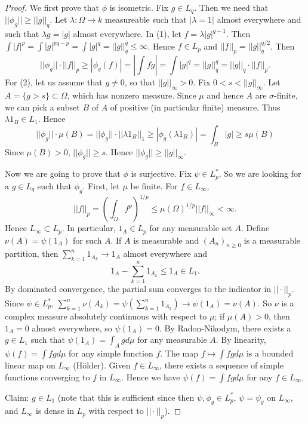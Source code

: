 \begin{proof}
  We first prove that $\phi$ is isometric.
  Fix $g\in L_q$.
  Then we need that $||\phi_g||\geq ||g||_q$.
  Let $\lambda:\Omega\to k$ measureable such that $|\lambda =1|$ almost everywhere
  and such that $\lambda g=|g|$ almost everywhere.
  In (1), let $f=\lambda |g|^{q-1}$.
  Then $\int |f|^p=\int |g|^{pq-p}=\int |g|^q=||g||_q^q\leq \infty$.
  Hence $f\in L_p$ and $||f||_p=||g||_q^{q/2}$.
  Then $$||\phi_g||\cdot ||f||_p\geq |\phi_g(f)|=|\int f g | = \int |g|^q=||g||_q^q=||g||_q\cdot ||f||_p.$$
  For (2), let us assume that $g\neq 0$, so that $||g||_\infty>0$.
  Fix $0<s<||g||_\infty$.
  Let $A=\{g>s\}\subset \Omega$, which has nonzero measure.
  Since $\mu$ and hence $A$ are $\sigma$-finite,
  we can pick a subset $B$ of $A$ of positive (in particular finite) measure.
  Thus $\lambda 1_B\in L_1$.
  Hence
  $$||\phi_g||\cdot \mu(B)=||\phi_g||\cdot ||\lambda 1_B||_1\geq |\phi_g (\lambda 1_B)|=\int_B |g|\geq s\mu (B)$$
  Since $\mu(B)>0$, $||\phi_g||\geq s$.
  Hence $||\phi_g||\geq ||g||_\infty$.

  Now we are going to prove that $\phi$ is surjective.
  Fix $\psi\in L_p^*$.
  So we are looking for a $g\in L_q$ such that $\phi_g$.
  First, let $\mu$ be finite. For $f\in L_\infty$,
  $$||f||_p=\left(\int_\Omega f^p\right)^{1/p}\leq \mu(\Omega)^{1/p}||f||_\infty<\infty.$$
  Hence $L_\infty \subset L_p$. In particular, $1_A\in L_p$ for any measurable set $A$.
  Define $\nu(A)=\psi(1_A)$ for such $A$.
  If $A$ is measurable and $(A_n)_{n\geq 0}$ is a measurable partition,
  then $\sum_{k=1}^n 1_{A_k}\to 1_A$ almost everywhere
  and
  $$1_A-\sum_{k=1}^n 1_{A_k}\leq 1_A\in L_1.$$
  By dominated convergence, the partial sum converges to the indicator in $||\cdot ||_p$.
  Since $\psi\in L_p^*$,
  $\sum_{k=1}^n\nu (A_k)=\psi(\sum_{k=1}^n 1_{A_k})\to \psi(1_A)=\nu(A)$.
  So $\nu$ is a complex measure absolutely continuous with respect to $\mu$;
  if $\mu(A)>0$, then $1_A=0$ almost everywhere, so $\psi(1_A)=0$.
  By Radon-Nikodym, there exists a $g\in L_1$ such that $\psi(1_A)=\int_A gd\mu$ for any measurable $A$.
  By linearity,
  $\psi(f)=\int fgd\mu$ for any simple function $f$.
  The map $f\mapsto \int fgd\mu$ is a bounded linear map on $L_\infty$ (H\"older).
  Given $f\in L_\infty$, there exists a sequence of simple functions converging to $f$ in $L_\infty$.
  Hence we have $\psi(f)=\int fg d\mu$ for any $f\in L_\infty$.

  Claim: $g\in L_1$ (note that this is sufficient since then $\psi, \phi_g\in L_p^*$, $\psi=\psi_g$ on $L_\infty$,
  and $L_\infty$ is dense in $L_p$ with respect to $||\cdot ||_p$).


\end{proof}
